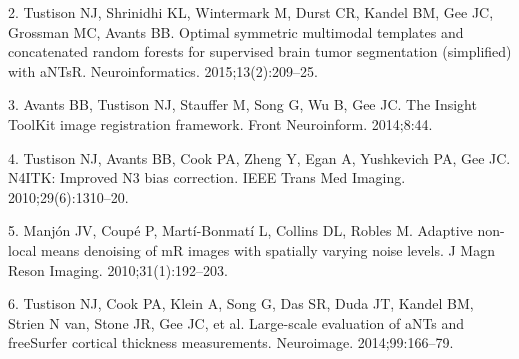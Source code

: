 \documentclass[12pt,]{article}
\begin{document}
\hypertarget{ref-Tustison:2015aa}{}
2. Tustison NJ, Shrinidhi KL, Wintermark M, Durst CR, Kandel BM, Gee JC,
Grossman MC, Avants BB. Optimal symmetric multimodal templates and
concatenated random forests for supervised brain tumor segmentation
(simplified) with aNTsR. Neuroinformatics. 2015;13(2):209--25.

\hypertarget{ref-Avants:2014aa}{}
3. Avants BB, Tustison NJ, Stauffer M, Song G, Wu B, Gee JC. The Insight
ToolKit image registration framework. Front Neuroinform. 2014;8:44.

\hypertarget{ref-Tustison:2010ac}{}
4. Tustison NJ, Avants BB, Cook PA, Zheng Y, Egan A, Yushkevich PA, Gee
JC. N4ITK: Improved N3 bias correction. IEEE Trans Med Imaging.
2010;29(6):1310--20.

\hypertarget{ref-Manjon:2010aa}{}
5. Manjón JV, Coupé P, Martí-Bonmatí L, Collins DL, Robles M. Adaptive
non-local means denoising of mR images with spatially varying noise
levels. J Magn Reson Imaging. 2010;31(1):192--203.

\hypertarget{ref-Tustison:2014ab}{}
6. Tustison NJ, Cook PA, Klein A, Song G, Das SR, Duda JT, Kandel BM,
Strien N van, Stone JR, Gee JC, et al. Large-scale evaluation of aNTs
and freeSurfer cortical thickness measurements. Neuroimage.
2014;99:166--79.
\end{document}
